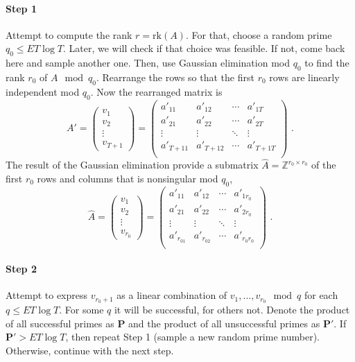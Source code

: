 \documentclass[paper=a4, fontsize=11pt]{scrartcl} %
\numberwithin{equation}{section} %
\numberwithin{figure}{section} %
\numberwithin{table}{section} %
\begin{document}
\paragraph{Step 1}Attempt to compute the rank $r = \mathrm{rk}(A)$. For that, choose a random prime $q_0\leq ET\log T$. Later, we will check if that choice was feasible. If not, come back here and sample another one. Then, use Gaussian elimination mod $q_0$ to find the rank $r_0$ of $A\mod q_0$. Rearrange the rows so that the first $r_0$ rows are linearly independent mod $q_0$. Now the rearranged matrix is
\begin{equation}
A' =
\begin{pmatrix}
v_1\\v_2\\\vdots\\v_{T\!+\!1}
\end{pmatrix}
=
\begin{pmatrix}
a'_{11} & a'_{12} & \cdots & a'_{1T} \\
a'_{21} & a'_{22} & \cdots & a'_{2T} \\
\vdots & \vdots & \ddots & \vdots \\
a'_{T\!+\!11} & a'_{T\!+\!12} & \cdots & a'_{T\!+\!1T} \\
\end{pmatrix}
\text{ .}
\end{equation}
The result of the Gaussian elimination provide a submatrix $\hat{A} = \mathbb{Z}^{r_0\times r_0}$ of the first $r_0$ rows and columns that is nonsingular mod $q_0$,
\begin{equation}
\hat{A} =
\begin{pmatrix}
v_1\\v_2\\\vdots\\v_{r_0}
\end{pmatrix}
=
\begin{pmatrix}
a'_{11} & a'_{12} & \cdots & a'_{1r_0} \\
a'_{21} & a'_{22} & \cdots & a'_{2r_0} \\
\vdots & \vdots & \ddots & \vdots \\
a'_{r_01} & a'_{r_02} & \cdots & a'_{r_0r_0} \\
\end{pmatrix}
\text{ .}
\end{equation}
\paragraph{Step 2} Attempt to express $v_{r_0+1}$ as a linear combination of $v_1,...,v_{r_0}\mod q$ for each $q\leq ET\log T$. For some $q$ it will be successful, for others not. Denote the product of all successful primes as $\boldsymbol{P}$ and the product of all unsuccessful primes as $\boldsymbol{P'}$. If $\boldsymbol{P'} > ET\log T$, then repeat Step 1 (sample a new random prime number). Otherwise, continue with the next step.
\end{document}
